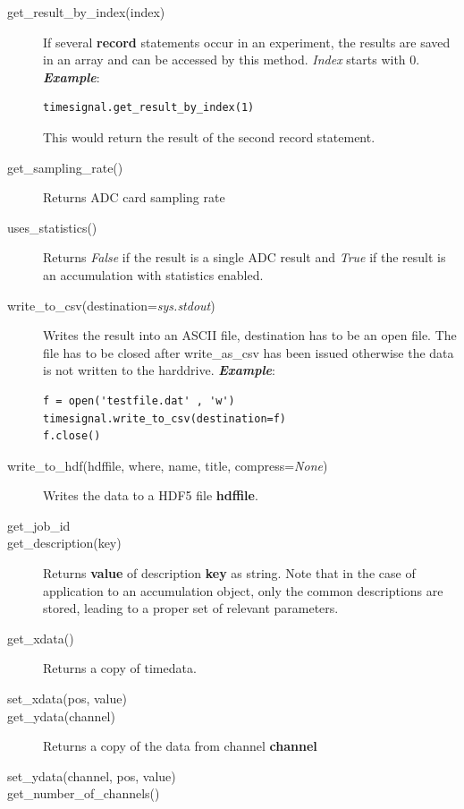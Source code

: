 \documentclass[12pt, a4paper, BCOR10mm, twoside, titlepage, headinclude]{scrbook}
\begin{document}
\begin{description}
\item[get\_result\_by\_index(index)] 
If several \textbf{record} statements occur in an experiment, the results are saved in an array and can be accessed by this method. \textit{Index} starts with 0.
\newline
\emph{\textbf{Example}}:
\begin{lstlisting}
timesignal.get_result_by_index(1)
\end{lstlisting}
This would return the result of the second record statement.
\item[get\_sampling\_rate()]
Returns ADC card sampling rate
\item[uses\_statistics()]
Returns \textit{False} if the result is a single ADC result and \textit{True} if the result is an accumulation with statistics enabled.
\item[write\_to\_csv(destination=\textit{sys.stdout})]
Writes the result into an ASCII file, destination has to be an open file. The file has to be closed after write\_as\_csv has been  issued otherwise the data is not written to the harddrive.
\newline
\emph{\textbf{Example}}:
\begin{lstlisting}
f = open('testfile.dat' , 'w')
timesignal.write_to_csv(destination=f)
f.close()
\end{lstlisting}
\item[write\_to\_hdf(hdffile, where, name, title, compress=\textit{None})]
Writes the data to a HDF5 file \textbf{hdffile}.
\item[get\_job\_id]
\item[get\_description(key)]
Returns \textbf{value} of description \textbf{key} as string. Note that in the case of application to an accumulation object, only the common descriptions are stored, leading to a proper set of relevant parameters.
\item[get\_xdata()]
Returns a copy of timedata.
\item[set\_xdata(pos, value)]
\item[get\_ydata(channel)]
Returns a copy of the data from channel \textbf{channel}
\item[set\_ydata(channel, pos, value)]
\item[get\_number\_of\_channels()]

\end{description}
\end{document}
